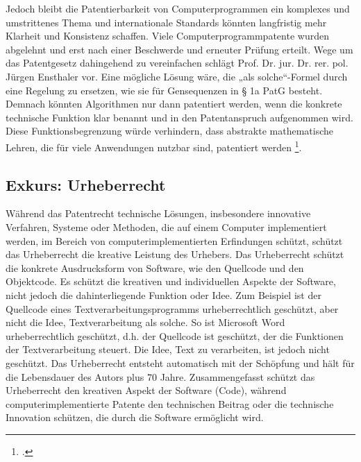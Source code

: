 Jedoch bleibt die Patentierbarkeit von Computerprogrammen 
ein komplexes und umstrittenes Thema 
und internationale Standards könnten 
langfristig mehr Klarheit und Konsistenz schaffen.
Viele Computerprogrammpatente wurden abgelehnt und erst nach 
einer Beschwerde und erneuter Prüfung erteilt.
Wege um das Patentgesetz dahingehend zu vereinfachen schlägt 
Prof. Dr. jur. Dr. rer. pol. Jürgen Ensthaler 
vor. 
Eine mögliche Lösung wäre, die „als solche“-Formel durch eine Regelung zu ersetzen, 
wie sie für Gensequenzen in § 1a PatG besteht. 
Demnach könnten Algorithmen nur dann patentiert werden, 
wenn die konkrete technische Funktion klar benannt 
und in den Patentanspruch aufgenommen wird. 
Diese Funktionsbegrenzung würde verhindern, 
dass abstrakte mathematische Lehren, 
die für viele Anwendungen nutzbar sind, patentiert werden 
\footcite{ensthalerEnsthalerBegrenzungPatentierung2013}. 
\subsection{Exkurs: Urheberrecht\label{sec:urh}}
Während das Patentrecht technische Lösungen, 
insbesondere innovative Verfahren, 
Systeme oder Methoden, die auf einem Computer implementiert werden,
im Bereich von computerimplementierten Erfindungen
schützt, schützt das Urheberrecht die kreative Leistung des Urhebers.
Das Urheberrecht schützt die konkrete Ausdrucksform von Software, 
wie den Quellcode und den Objektcode. 
Es schützt die kreativen und individuellen Aspekte der Software, 
nicht jedoch die dahinterliegende Funktion oder Idee.
Zum Beispiel ist
der Quellcode eines Textverarbeitungsprogramms
urheberrechtlich geschützt, 
aber nicht die Idee, Textverarbeitung als solche.
So ist Microsoft Word urheberrechtlich geschützt, d.h.
der Quellcode ist geschützt,
der die Funktionen der Textverarbeitung steuert.
Die Idee, Text zu verarbeiten, ist jedoch nicht geschützt.
Das Urheberrecht entsteht automatisch mit der Schöpfung 
und hält für die Lebensdauer des Autors plus 70 Jahre.
Zusammengefasst schützt das Urheberrecht den kreativen Aspekt der Software (Code), 
während computerimplementierte Patente 
den technischen Beitrag oder die technische Innovation schützen, 
die durch die Software ermöglicht wird.

